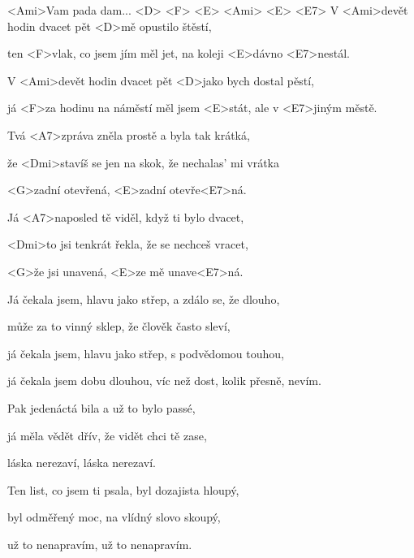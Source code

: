 

\zr
<Ami>Vam pada dam... <D> <F> <E> <Ami> <E> <E7>
\kr
\zs
V <Ami>devět hodin dvacet pět <D>mě opustilo štěstí,

ten <F>vlak, co jsem jím měl jet, na koleji <E>dávno <E7>nestál.

V <Ami>devět hodin dvacet pět <D>jako bych dostal pěstí,

já <F>za hodinu na náměstí měl jsem <E>stát,
ale v <E7>jiným městě.


Tvá <A7>zpráva zněla prostě a byla tak krátká,

že <Dmi>stavíš se jen na skok, že nechalas' mi vrátka

<G>zadní otevřená, <E>zadní otevře<E7>ná.



Já <A7>naposled tě viděl, když ti bylo dvacet,

<Dmi>to jsi tenkrát řekla, že se nechceš vracet,

<G>že jsi unavená, <E>ze mě unave<E7>ná.
\ks

\zr \kr

\zs
Já čekala jsem, hlavu jako střep, a zdálo se, že dlouho,

může za to vinný sklep, že člověk často sleví,

já čekala jsem, hlavu jako střep, s podvědomou touhou,

já čekala jsem dobu dlouhou, víc než dost, kolik přesně, nevím.



Pak jedenáctá bila a už to bylo passé,

já měla vědět dřív, že vidět chci tě zase,

láska nerezaví, láska nerezaví.



Ten list, co jsem ti psala, byl dozajista hloupý,

byl odměřený moc, na vlídný slovo skoupý,

už to nenapravím, už to nenapravím.
\ks
\zr \kr
\kp
